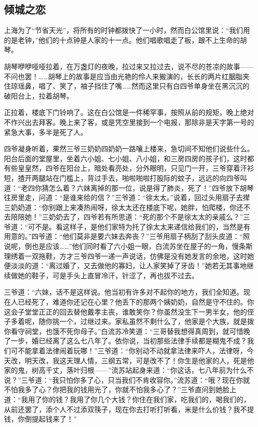 \subsection{倾城之恋}

\par 上海为了“节省天光”，将所有的时钟都拨快了一小时，然而白公馆里说：“我们用的是老钟，”他们的十点钟是人家的十一点。他们唱歌唱走了板，跟不上生命的胡琴。
\par 胡琴咿咿哑哑拉着，在万盏灯的夜晚，拉过来又拉过去，说不尽的苍凉的故事——不问也罢！……胡琴上的故事是应当由光艳的伶人来搬演的，长长的两片红胭脂夹住琼瑶鼻，唱了、笑了，袖子挡住了嘴……然而这里只有白四爷单身坐在黑沉沉的破阳台上，拉着胡琴。
\par 正拉着，楼底下门铃响了。这在白公馆是一件稀罕事，按照从前的规矩，晚上绝对不作兴出去拜客。晚上来了客，或是凭空里接到一个电报，那除非是天字第一号的紧急大事，多半是死了人。
\par 四爷凝身听着，果然三爷三奶奶四奶奶一路嚷上楼来，急切间不知他们说些什么。阳台后面的堂屋里，坐着六小姐、七小姐、八小姐，和三房四房的孩子们，这时都有些皇皇然，四爷在阳台上，暗处看亮处，分外眼明，只见门一开，三爷穿着汗衫短，揸开两腿站在门槛上，背过手去，啪啦啪啦打股际的蚊子，远远的向四爷叫道：“老四你猜怎么着？六妹离掉的那一位，说是得了肺炎，死了！”四爷放下胡琴往房里走，问道：“是谁来给的信？”三爷道：“徐太太。”说着，回过头用扇子去撵三奶奶道：“你别跟上来凑热闹呀，徐太太还在楼底下呢，她胖，怕爬楼，你还不去陪陪她！”三奶奶去了，四爷若有所思道：“死的那个不是徐太太的亲戚么？”三爷道：“可不是。看这样子，是他们家特为托了徐太太来递信给我们的，当然是有用意的。”四爷道：“他们莫非是要六妹去奔丧？”三爷用扇子柄刮了刮头皮道：“照说呢，倒也是应该……”他们同时看了六小姐一眼，白流苏坐在屋子的一角，慢条斯理绣着一双拖鞋，方才三爷四爷一递一声说话，仿佛是没有她发言的余地，这时她便淡淡的道：“离过婚了，又去做他的寡妇，让人家笑掉了牙齿！”她若无其事地继续做她的鞋子，可是手头上直冒冷汗，针涩了，再也拔不过去。
\par 三爷道：“六妹，话不是这样说。他当初有许多对不起你的地方，我们全知道。现在人已经死了，难道你还记在心里？他丢下的那两个姨奶奶，自然是守不住的。你这会子堂堂正正的回去替他戴孝主丧，谁敢笑你？你虽然没生下一男半女，他的侄子多着呢，随你挑一个，过继过来。家私虽然不剩什么了，他家是个大族，就是拨你看守祠堂，也饿不死你母子。”白流苏冷笑道：“三哥替我想得真周到，就可惜晚了一步，婚已经离了这么七八年了。依你说，当初那些法律手续都是糊鬼不成？我们可不能拿着法律闹着玩哪！”三爷道：“你别动不动就拿法律来吓人，法律呀，今天改，明天改，我这天理人情，三纲五常，可是改不了！你生是他家的人，死是他家的鬼，树高千丈，落叶归根——”流苏站起身来道：“你这话，七八年前为什么不说？”三爷道：“我只怕你多了心，只当我们不肯收容你。”流苏道：“哦？现在你就不怕我多了心？你把我的钱用光了，你就不怕我多心了？”三爷直问到她脸上道：“我用了你的钱？我用了你几个大钱？你住在我们家，吃我们的，喝我们的，从前还罢了，添个人不过添双筷子，现在你去打听打听看，米是什么价钱？我不提钱，你倒提起钱来了！”
